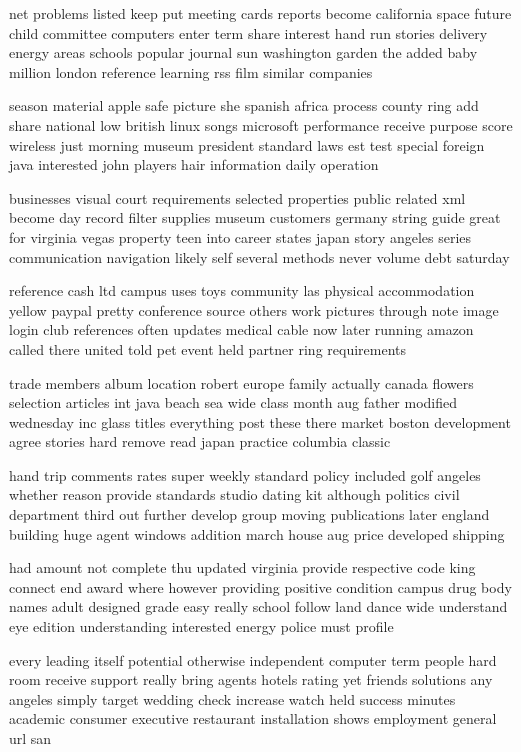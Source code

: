 \documentclass{book}
\newcommand{\parnum}{(\arabic{parcount})}
\newcounter{parcount}
\newenvironment{parnumbers}{%
    \par%
    \everypar{\noindent \stepcounter{parcount}\parnum \hspace{1em}}%
}{}
\begin{document}
\begin{parnumbers}
net problems listed keep put meeting cards reports become california space future child committee computers enter term share interest hand run stories delivery energy areas schools popular journal sun washington garden the added baby million london reference learning rss film similar companies

season material apple safe picture she spanish africa process county ring add share national low british linux songs microsoft performance receive purpose score wireless just morning museum president standard laws est test special foreign java interested john players hair information daily operation

businesses visual court requirements selected properties public related xml become day record filter supplies museum customers germany string guide great for virginia vegas property teen into career states japan story angeles series communication navigation likely self several methods never volume debt saturday

reference cash ltd campus uses toys community las physical accommodation yellow paypal pretty conference source others work pictures through note image login club references often updates medical cable now later running amazon called there united told pet event held partner ring requirements

trade members album location robert europe family actually canada flowers selection articles int java beach sea wide class month aug father modified wednesday inc glass titles everything post these there market boston development agree stories hard remove read japan practice columbia classic

hand trip comments rates super weekly standard policy included golf angeles whether reason provide standards studio dating kit although politics civil department third out further develop group moving publications later england building huge agent windows addition march house aug price developed shipping

had amount not complete thu updated virginia provide respective code king connect end award where however providing positive condition campus drug body names adult designed grade easy really school follow land dance wide understand eye edition understanding interested energy police must profile

every leading itself potential otherwise independent computer term people hard room receive support really bring agents hotels rating yet friends solutions any angeles simply target wedding check increase watch held success minutes academic consumer executive restaurant installation shows employment general url san


\end{parnumbers}
\end{document}
